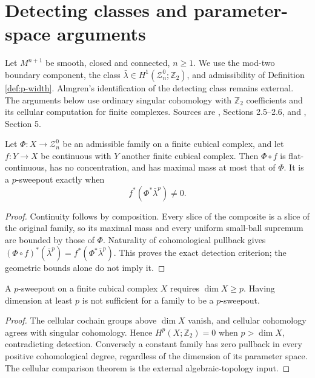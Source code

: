 \chapter{Detecting classes and parameter-space arguments}\label{sec:sweepout-topology}
Let $M^{n+1}$ be smooth, closed and connected, $n\geq1$. We use the mod-two boundary component, the class $\bar\lambda\in H^1(\mathcal Z_n^0;\mathbb Z_2)$, and admissibility of Definition \ref{def:p-width}. Almgren's identification of the detecting class remains external. The arguments below use ordinary singular cohomology with $\mathbb Z_2$ coefficients and its cellular computation for finite complexes. Sources are \cite{LMN}, Sections 2.5--2.6, and \cite{MNIndex}, Section 5.

\begin{lemma}\label{lem:sweepout-pullback}
Let $\Phi:X\to\mathcal Z_n^0$ be an admissible family on a finite cubical complex, and let $f:Y\to X$ be continuous with $Y$ another finite cubical complex. Then $\Phi\circ f$ is flat-continuous, has no concentration, and has maximal mass at most that of $\Phi$. It is a $p$-sweepout exactly when
\[
 f^*(\Phi^*\bar\lambda^p)\ne0.
\]
\end{lemma}
\begin{proof}
Continuity follows by composition. Every slice of the composite is a slice of the original family, so its maximal mass and every uniform small-ball supremum are bounded by those of $\Phi$. Naturality of cohomological pullback gives $(\Phi\circ f)^*(\bar\lambda^p)=f^*(\Phi^*\bar\lambda^p)$. This proves the exact detection criterion; the geometric bounds alone do not imply it.
\end{proof}

\begin{proposition}\label{prop:sweepout-parameter-dimension}
A $p$-sweepout on a finite cubical complex $X$ requires $\dim X\geq p$. Having dimension at least $p$ is not sufficient for a family to be a $p$-sweepout.
\end{proposition}
\begin{proof}
The cellular cochain groups above $\dim X$ vanish, and cellular cohomology agrees with singular cohomology. Hence $H^p(X;\mathbb Z_2)=0$ when $p>\dim X$, contradicting detection. Conversely a constant family has zero pullback in every positive cohomological degree, regardless of the dimension of its parameter space. The cellular comparison theorem is the external algebraic-topology input.
\end{proof}

